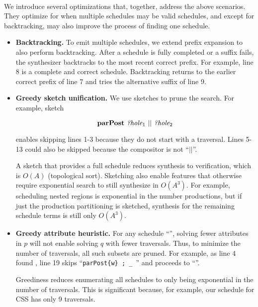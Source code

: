 \paragraph{}

We introduce several optimizations that, together, address the above scenarios. They optimize for when multiple schedules may be valid schedules, and except for backtracking, may also improve the process of finding one schedule. 
\begin{itemize}

\item \textbf{Backtracking.} To emit multiple schedules, we extend prefix expansion to also perform backtracking. After a schedule is fully completed or a suffix fails, the synthesizer backtracks to the most recent correct prefix. For example, line 8 is a complete and correct schedule. Backtracking returns to the earlier correct prefix of line 7 and tries the alternative suffix of line 9. 



\item \textbf{Greedy sketch unification.} We use sketches to prune the search. For example,  sketch

$$\text{\textbf{parPost}}~ {\emph{?hole}}_1 ~ || ~{\emph{?hole}}_2$$ 

enables skipping lines 1-3 because they do not start with a  traversal. Lines 5-13 could also be skipped because the compositor is not ``$||$''. 

A sketch that provides a full schedule reduces synthesis to verification, which is $O(A)$ (topological sort). Sketching also enable features that otherwise require exponential search to still synthesize in $O(A^3)$. For example, scheduling nested regions is exponential in the number productions, but if just the production partitioning is sketched, synthesis for the remaining schedule terms is still only $O(A^3)$.

\item \textbf{Greedy attribute heuristic.} For any schedule ``'', solving fewer attributes in $p$ will not enable solving $q$ with fewer traversals. Thus, to minimize the number of traversals, all such subsets are pruned. For example, as line 4 found , line 19 skips ``\lstinline[morekeywords={parPost}]|parPost{w} ; _ |'' and proceeds to ``''. 

Greediness reduces enumerating all schedules to only being exponential in the number of traversals. This is significant because, for example, our schedule for CSS has only 9 traversals.
\end{itemize}

